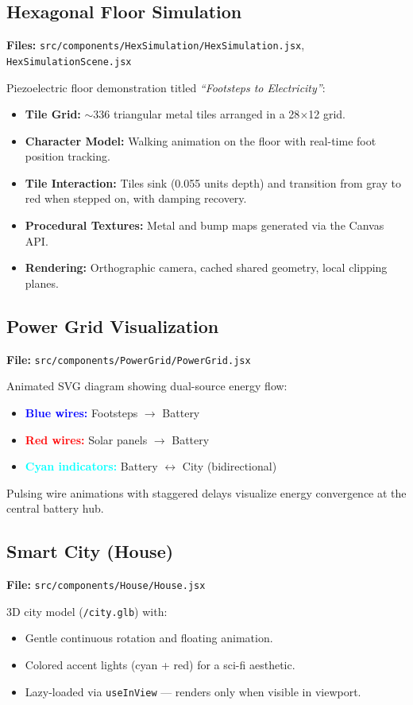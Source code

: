 \documentclass[12pt,a4paper]{article}
\begin{document}
\subsection{Hexagonal Floor Simulation}
\textbf{Files:} \texttt{src/components/HexSimulation/HexSimulation.jsx}, \texttt{HexSimulationScene.jsx}

Piezoelectric floor demonstration titled \textit{``Footsteps to Electricity''}:
\begin{itemize}
    \item \textbf{Tile Grid:} $\sim$336 triangular metal tiles arranged in a 28$\times$12 grid.
    \item \textbf{Character Model:} Walking animation on the floor with real-time foot position tracking.
    \item \textbf{Tile Interaction:} Tiles sink (0.055 units depth) and transition from gray to red when stepped on, with damping recovery.
    \item \textbf{Procedural Textures:} Metal and bump maps generated via the Canvas API.
    \item \textbf{Rendering:} Orthographic camera, cached shared geometry, local clipping planes.
\end{itemize}

\subsection{Power Grid Visualization}
\textbf{File:} \texttt{src/components/PowerGrid/PowerGrid.jsx}

Animated SVG diagram showing dual-source energy flow:
\begin{itemize}
    \item \textcolor{blue}{\textbf{Blue wires:}} Footsteps $\rightarrow$ Battery
    \item \textcolor{red}{\textbf{Red wires:}} Solar panels $\rightarrow$ Battery
    \item \textcolor{cyan}{\textbf{Cyan indicators:}} Battery $\leftrightarrow$ City (bidirectional)
\end{itemize}
Pulsing wire animations with staggered delays visualize energy convergence at the central battery hub.

\subsection{Smart City (House)}
\textbf{File:} \texttt{src/components/House/House.jsx}

3D city model (\texttt{/city.glb}) with:
\begin{itemize}
    \item Gentle continuous rotation and floating animation.
    \item Colored accent lights (cyan + red) for a sci-fi aesthetic.
    \item Lazy-loaded via \texttt{useInView} --- renders only when visible in viewport.
\end{itemize}
\end{document}
